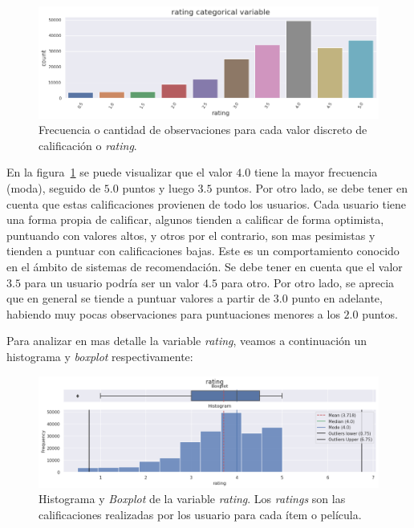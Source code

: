 \documentclass[11pt,a4paper,twoside]{thesis}
\begin{document}
\begin{figure}[h!]
	\centering
	\includegraphics[width=15cm]{./images/rating-barplot.png}
	\caption{Frecuencia o cantidad de observaciones para cada valor discreto de calificación o \textit{rating}.}
	\label{fig:ratingsBarPlot}
\end{figure}

En la figura~\ref{fig:ratingsBarPlot} se puede visualizar que el valor $4.0$
tiene la mayor frecuencia (moda), seguido de $5.0$ puntos y luego $3.5$ puntos.
Por otro lado, se debe tener en cuenta que estas calificaciones provienen de
todo los usuarios. Cada usuario tiene una forma propia de calificar, algunos
tienden a calificar de forma optimista, puntuando con valores altos, y otros
por el contrario, son mas pesimistas y tienden a puntuar con calificaciones
bajas. Este es un comportamiento conocido en el ámbito de sistemas de
recomendación. Se debe tener en cuenta que el valor $3.5$ para un usuario
podría ser un valor $4.5$ para otro. Por otro lado, se aprecia que en general
se tiende a puntuar valores a partir de $3.0$ punto en adelante, habiendo muy
pocas observaciones para puntuaciones menores a los $2.0$ puntos.

\clearpage

Para analizar en mas detalle la variable \textit{rating}, veamos a continuación
un histograma y \textit{boxplot} respectivamente:

\begin{figure}[h!]
	\centering
	\includegraphics[width=15cm]{./images/rating-boxplot-histplot.png}
	\caption{Histograma y \textit{Boxplot} de la variable \textit{rating}. Los \textit{ratings} son las calificaciones realizadas por los usuario para cada ítem o película.}
	\label{fig:ratingsHistPlot}
\end{figure}
\end{document}
